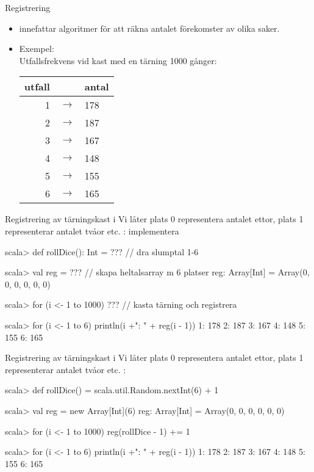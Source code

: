 


\begin{Slide}{Registrering}
\begin{itemize}
\item {} innefattar algoritmer för att räkna antalet förekomster av olika saker.

\item Exempel:
\\\vspace{0.5em}Utfallsfrekvens vid kast med en tärning 1000 gånger:

\vspace{1em}\begin{tabular}{r c l}
utfall & & antal \\ \hline
1 & $\rightarrow$ & 178 \\
2 & $\rightarrow$ & 187 \\
3 & $\rightarrow$ & 167 \\
4 & $\rightarrow$ & 148 \\
5 & $\rightarrow$ & 155 \\
6 & $\rightarrow$ & 165 \\
\end{tabular}
\end{itemize}
\end{Slide}

\begin{Slide}{Registrering av tärningskast i }
Vi låter plats 0 representera antalet ettor, plats 1 representerar antalet tvåor etc. : implementera 
\begin{REPLnonum}
scala> def rollDice(): Int = ???  // dra slumptal 1-6

scala> val reg = ???  // skapa heltalsarray m 6 platser
reg: Array[Int] = Array(0, 0, 0, 0, 0, 0)

scala> for (i <- 1 to 1000) ???  // kasta tärning och registrera

scala> for (i <- 1 to 6) println(i +": " + reg(i - 1))
1: 178
2: 187
3: 167
4: 148
5: 155
6: 165
\end{REPLnonum}
\end{Slide}


\begin{Slide}{Registrering av tärningskast i }
Vi låter plats 0 representera antalet ettor, plats 1 representerar antalet tvåor etc. :
\begin{REPLnonum}
scala> def rollDice() = scala.util.Random.nextInt(6) + 1

scala> val reg = new Array[Int](6)
reg: Array[Int] = Array(0, 0, 0, 0, 0, 0)

scala> for (i <- 1 to 1000) reg(rollDice - 1) += 1

scala> for (i <- 1 to 6) println(i +": " + reg(i - 1))
1: 178
2: 187
3: 167
4: 148
5: 155
6: 165
\end{REPLnonum}
\end{Slide}

